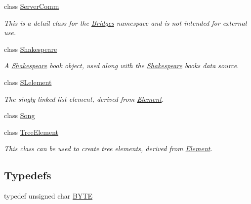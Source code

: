 \begin{DoxyCompactItemize}
class \hyperlink{classbridges_1_1_server_comm}{Server\+Comm}
\begin{DoxyCompactList}\small\item\em This is a detail class for the \hyperlink{namespacebridges_1_1_bridges}{Bridges} namespace and is not intended for external use. \end{DoxyCompactList}\item 
class \hyperlink{classbridges_1_1_shakespeare}{Shakespeare}
\begin{DoxyCompactList}\small\item\em A \hyperlink{classbridges_1_1_shakespeare}{Shakespeare} book object, used along with the \hyperlink{classbridges_1_1_shakespeare}{Shakespeare} books data source. \end{DoxyCompactList}\item 
class \hyperlink{classbridges_1_1_s_lelement}{S\+Lelement}
\begin{DoxyCompactList}\small\item\em The singly linked list element, derived from \hyperlink{classbridges_1_1_element}{Element}. \end{DoxyCompactList}\item 
class \hyperlink{classbridges_1_1_song}{Song}
\item 
class \hyperlink{classbridges_1_1_tree_element}{Tree\+Element}
\begin{DoxyCompactList}\small\item\em This class can be used to create tree elements, derived from \hyperlink{classbridges_1_1_element}{Element}. \end{DoxyCompactList}\end{DoxyCompactItemize}
\subsection*{Typedefs}
\begin{DoxyCompactItemize}
\item 
typedef unsigned char \hyperlink{namespacebridges_a59b77ee45243ba85c701fb8ab298ef00}{B\+Y\+T\+E}
\end{DoxyCompactItemize}
